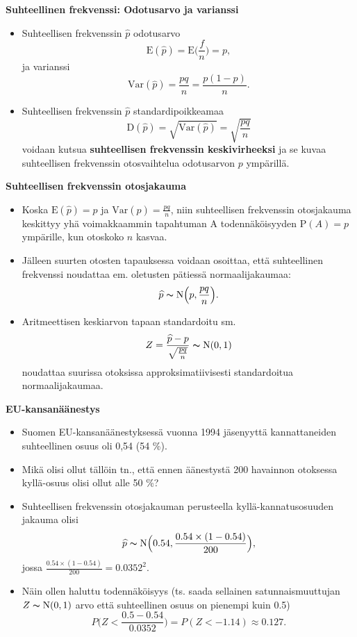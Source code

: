 \documentclass[
]{book}
\begin{document}
\textbf{Suhteellinen frekvenssi: Odotusarvo ja varianssi}

\begin{itemize}
\item
  Suhteellisen frekvenssin \(\widehat{p}\) odotusarvo
  \[
  \text{E}(\widehat{p}) = \text{E} \Big(\frac{f}{n} \Big) = p,
  \]
  ja varianssi
  \[
  \mathrm{Var}(\widehat{p}) = \frac{pq}{n} = \frac{p(1-p)}{n}.
  \]
\item
  Suhteellisen frekvenssin \(\widehat{p}\) standardipoikkeamaa
  \[
  \text{D}(\widehat{p}) = \sqrt{\mathrm{Var} (\widehat{p})} =  \sqrt{\frac{pq}{n}}
  \]
  voidaan kutsua \textbf{suhteellisen frekvenssin keskivirheeksi} ja se kuvaa suhteellisen frekvenssin otosvaihtelua odotusarvon \(p\) ympärillä.
\end{itemize}

\textbf{Suhteellisen frekvenssin otosjakauma}

\begin{itemize}
\item
  Koska \(\text{E}(\widehat{p}) = p\) ja \(\mathrm{Var}(\widehat{p}) = \frac{pq}{n}\),
  niin suhteellisen frekvenssin otosjakauma keskittyy yhä voimakkaammin tapahtuman A
  todennäköisyyden \(\text{P}(A) = p\) ympärille, kun otoskoko \(n\) kasvaa.
\item
  Jälleen suurten otosten tapauksessa voidaan osoittaa, että suhteellinen frekvenssi noudattaa em. oletusten pätiessä normaalijakaumaa:
  \[
  \widehat{p} \thicksim \text{N} \Big(p, \frac{pq}{n} \Big).
  \]
\item
  Aritmeettisen keskiarvon tapaan standardoitu sm.
  \[
  Z = \frac{\widehat{p} - p}{\sqrt{\frac{pq}{n}}} \thicksim \text{N}(0,1)
  \]
  noudattaa suurissa otoksissa approksimatiivisesti standardoitua normaalijakaumaa.
\end{itemize}

\newpage

\begin{eblock}{}

\textbf{EU-kansanäänestys}

\begin{itemize}
\item
  Suomen EU-kansanäänestyksessä vuonna 1994 jäsenyyttä kannattaneiden suhteellinen osuus oli 0,54 (54 \%).
\item
  Mikä olisi ollut tällöin tn., että ennen äänestystä 200 havainnon otoksessa kyllä-osuus olisi ollut alle 50 \%?
\item
  Suhteellisen frekvenssin otosjakauman perusteella kyllä-kannatusosuuden jakauma olisi
  \[
  \widehat{p} \thicksim \text{N} \Big(0.54, \frac{0.54 \times (1-0.54)}{200} \Big),
  \]
  jossa \(\frac{0.54 \times (1-0.54)}{200} = 0.0352^2\).
\item
  Näin ollen haluttu todennäköisyys (ts. saada sellainen satunnaismuuttujan \(Z \thicksim \text{N}(0,1)\) arvo että suhteellinen osuus on pienempi kuin 0.5)
  \[
  P \Big(Z < \frac{0.5-0.54}{0.0352} \Big) = P (Z < -1.14) \approx 0.127.
  \]
\end{itemize}

\end{eblock}
\end{document}
